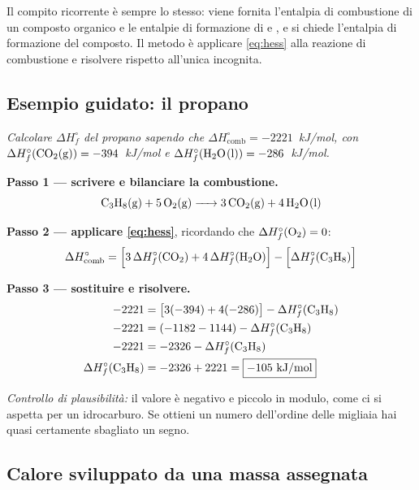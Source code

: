 \documentclass[11pt, a4paper, openright]{book}
\begin{document}
Il compito ricorrente è sempre lo stesso: viene fornita l'entalpia di combustione di un
composto organico e le entalpie di formazione di  e , e si chiede
l'entalpia di formazione del composto. Il metodo è applicare
\eqref{eq:hess} alla reazione di combustione e risolvere rispetto all'unica incognita.

\subsection{Esempio guidato: il propano}

\emph{Calcolare $\Delta H^\circ_f$ del propano  sapendo che
$\Delta H^\circ_{\text{comb}} = -2221$~kJ/mol, con
$\Delta H^\circ_f(\ce{CO2(g)}) = -394$~kJ/mol e
$\Delta H^\circ_f(\ce{H2O(l)}) = -286$~kJ/mol.}

\medskip
\noindent\textbf{Passo 1 --- scrivere e bilanciare la combustione.}
\begin{equation*}
  \ce{C3H8(g) + 5 O2(g) -> 3 CO2(g) + 4 H2O(l)}
\end{equation*}

\noindent\textbf{Passo 2 --- applicare \eqref{eq:hess}}, ricordando che
$\Delta H^\circ_f(\ce{O2}) = 0$:
\begin{equation*}
  \Delta H^\circ_{\text{comb}}
  = \Big[ 3\,\Delta H^\circ_f(\ce{CO2}) + 4\,\Delta H^\circ_f(\ce{H2O}) \Big]
  - \Big[ \Delta H^\circ_f(\ce{C3H8}) \Big]
\end{equation*}

\noindent\textbf{Passo 3 --- sostituire e risolvere.}
\begin{align*}
  -2221 &= \big[ 3(-394) + 4(-286) \big] - \Delta H^\circ_f(\ce{C3H8}) \\
  -2221 &= (-1182 - 1144) - \Delta H^\circ_f(\ce{C3H8}) \\
  -2221 &= -2326 - \Delta H^\circ_f(\ce{C3H8}) \\
  \Delta H^\circ_f(\ce{C3H8}) &= -2326 + 2221 = \boxed{-105 \ \text{kJ/mol}}
\end{align*}

\noindent\emph{Controllo di plausibilità:} il valore è negativo e piccolo in modulo, come
ci si aspetta per un idrocarburo. Se ottieni un numero dell'ordine delle migliaia hai quasi
certamente sbagliato un segno.

\subsection{Calore sviluppato da una massa assegnata}
\end{document}
